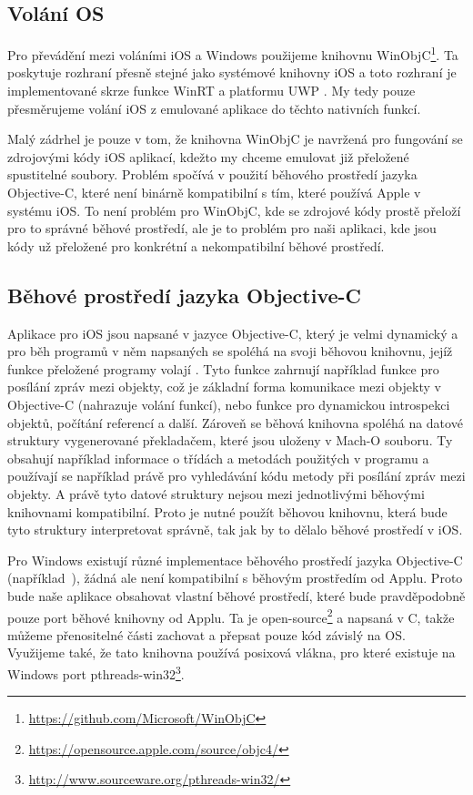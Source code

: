 \documentclass[12pt]{article}
\newcommand{\Rplus}{\protect\hspace{-.1em}\protect\raisebox{.35ex}{\smaller{\smaller\textbf{+}}}}
\newcommand{\Cpp}{\mbox{C\Rplus\Rplus}\xspace}
\begin{document}
\subsection*{Volání OS}
\label{sec:winobjc}

Pro převádění mezi voláními iOS a Windows použijeme knihovnu WinObjC\footnote{\url{https://github.com/Microsoft/WinObjC}}.
Ta poskytuje rozhraní přesně stejné jako systémové knihovny iOS a toto rozhraní je implementované skrze funkce WinRT a platformu UWP \cite{winobjc}.
My tedy pouze přesměrujeme volání iOS z emulované aplikace do těchto nativních funkcí.

Malý zádrhel je pouze v tom, že knihovna WinObjC je navržená pro fungování se zdrojovými kódy iOS aplikací, kdežto my chceme emulovat již přeložené spustitelné soubory.
Problém spočívá v použití běhového prostředí jazyka Objective-C, které není binárně kompatibilní s tím, které používá Apple v systému iOS.
To není problém pro WinObjC, kde se zdrojové kódy prostě přeloží pro to správné běhové prostředí, ale je to problém pro naši aplikaci, kde jsou kódy už přeložené pro konkrétní a nekompatibilní běhové prostředí.

\subsection*{Běhové prostředí jazyka Objective-C}

Aplikace pro iOS jsou napsané v jazyce Objective-C, který je velmi dynamický a pro běh programů v něm napsaných se spoléhá na svoji běhovou knihovnu, jejíž funkce přeložené programy volají \cite{objc, understandingObjc}.
Tyto funkce zahrnují například funkce pro posílání zpráv mezi objekty, což je základní forma komunikace mezi objekty v Objective-C (nahrazuje volání funkcí), nebo funkce pro dynamickou introspekci objektů, počítání referencí a další.
Zároveň se běhová knihovna spoléhá na datové struktury vygenerované překladačem, které jsou uloženy v Mach-O souboru.
Ty obsahují například informace o třídách a metodách použitých v programu a používají se například právě pro vyhledávání kódu metody při posílání zpráv mezi objekty.
A právě tyto datové struktury nejsou mezi jednotlivými běhovými knihovnami kompatibilní.
Proto je nutné použít běhovou knihovnu, která bude tyto struktury interpretovat správně, tak jak by to dělalo běhové prostředí v iOS.

Pro Windows existují různé implementace běhového prostředí jazyka Objective-C (například~\cite{modernObjc, gnustep}), žádná ale není kompatibilní s běhovým prostředím od Applu.
Proto bude naše aplikace obsahovat vlastní běhové prostředí, které bude pravděpodobně pouze port běhové knihovny od Applu.
Ta je open-source\footnote{\url{https://opensource.apple.com/source/objc4/}} a napsaná v \Cpp, takže můžeme přenositelné části zachovat a přepsat pouze kód závislý na OS.
Využijeme také, že tato knihovna používá posixová vlákna, pro které existuje na Windows port pthreads-win32\footnote{\url{http://www.sourceware.org/pthreads-win32/}}.



\end{document}
